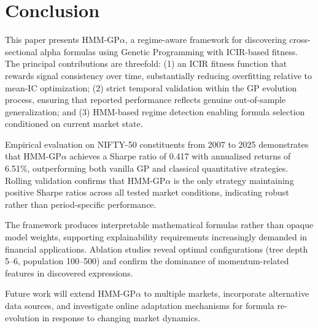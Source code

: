 \documentclass{ieeeaccess}
\begin{document}
\section{Conclusion}
\label{sec:conclusion}
This paper presents HMM-GP$\alpha$, a regime-aware framework for discovering cross-sectional alpha formulas using Genetic Programming with ICIR-based fitness. The principal contributions are threefold: (1) an ICIR fitness function that rewards signal consistency over time, substantially reducing overfitting relative to mean-IC optimization; (2) strict temporal validation within the GP evolution process, ensuring that reported performance reflects genuine out-of-sample generalization; and (3) HMM-based regime detection enabling formula selection conditioned on current market state.

Empirical evaluation on NIFTY-50 constituents from 2007 to 2025 demonstrates that HMM-GP$\alpha$ achieves a Sharpe ratio of 0.417 with annualized returns of 6.51\%, outperforming both vanilla GP and classical quantitative strategies. Rolling validation confirms that HMM-GP$\alpha$ is the only strategy maintaining positive Sharpe ratios across all tested market conditions, indicating robust rather than period-specific performance.

The framework produces interpretable mathematical formulas rather than opaque model weights, supporting explainability requirements increasingly demanded in financial applications. Ablation studies reveal optimal configurations (tree depth 5--6, population 100--500) and confirm the dominance of momentum-related features in discovered expressions.

Future work will extend HMM-GP$\alpha$ to multiple markets, incorporate alternative data sources, and investigate online adaptation mechanisms for formula re-evolution in response to changing market dynamics.
\end{document}
